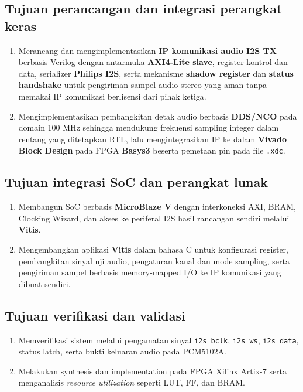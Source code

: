 \subsection{Tujuan perancangan dan integrasi perangkat keras}
\begin{enumerate}
	\item Merancang dan mengimplementasikan \textbf{IP komunikasi audio I2S TX} berbasis Verilog dengan antarmuka \textbf{AXI4-Lite slave}, register kontrol dan data, serializer \textbf{Philips I2S}, serta mekanisme \textbf{shadow register} dan \textbf{status handshake} untuk pengiriman sampel audio stereo yang aman tanpa memakai IP komunikasi berlisensi dari pihak ketiga.
	\item Mengimplementasikan pembangkitan detak audio berbasis \textbf{DDS/NCO} pada domain 100 MHz sehingga mendukung frekuensi sampling integer dalam rentang yang ditetapkan RTL, lalu mengintegrasikan IP ke dalam \textbf{Vivado Block Design} pada FPGA \textbf{Basys3} beserta pemetaan pin pada file \texttt{.xdc}.
\end{enumerate}

\subsection{Tujuan integrasi SoC dan perangkat lunak}
\begin{enumerate}
	\item Membangun SoC berbasis \textbf{MicroBlaze V} dengan interkoneksi AXI, BRAM, Clocking Wizard, dan akses ke periferal I2S hasil rancangan sendiri melalui \textbf{Vitis}.
	\item Mengembangkan aplikasi \textbf{Vitis} dalam bahasa C untuk konfigurasi register, pembangkitan sinyal uji audio, pengaturan kanal dan mode sampling, serta pengiriman sampel berbasis memory-mapped I/O ke IP komunikasi yang dibuat sendiri.
\end{enumerate}

\subsection{Tujuan verifikasi dan validasi}
\begin{enumerate}
	\item Memverifikasi sistem melalui pengamatan sinyal \texttt{i2s\_bclk}, \texttt{i2s\_ws}, \texttt{i2s\_data}, status latch, serta bukti keluaran audio pada PCM5102A.
	\item Melakukan synthesis dan implementation pada FPGA Xilinx Artix-7 serta menganalisis \textit{resource utilization} seperti LUT, FF, dan BRAM.
\end{enumerate}

